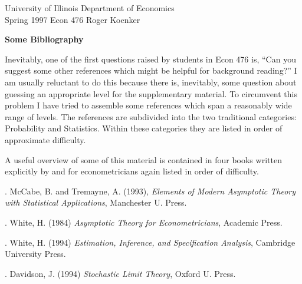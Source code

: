 \setlength{\textwidth}{170mm}
\setlength{\textheight}{220mm}
\setlength{\oddsidemargin}{0mm}
\setlength{\evensidemargin}{10mm}
\setlength{\topmargin}{-10mm}
\def\RR{\hbox{\raise.4ex\hbox{$\scriptstyle{|}$}\hskip-1.85pt R}}
\newcommand{\REF}{\nopagebreak\noindent{\large{\bf
      References}}\vspace{.2in}}

\newcommand{\Ref}[1]{\medskip\noindent\hangafter=1
      \hangindent=20pt\ignorespaces #1}
\pagestyle{empty}



\noindent
University of Illinois \hfill Department of Economics \\
Spring 1997 \hfill Econ 476 \hfill Roger Koenker

\vspace{4mm}
\begin{center}

\large{
{\bf Some Bibliography }}
\end{center}

\vspace{10mm}
Inevitably, one of the first questions raised by students in Econ 476 is, ``Can you suggest some other references which might be helpful for 
background reading?''  I am usually reluctant to do this because there is, 
inevitably, some question about guessing an appropriate level for the 
supplementary material.  To circumvent this problem I have tried to 
assemble some references which span a reasonably wide range of levels.  The
references are subdivided into the two traditional categories:  Probability 
and Statistics.  Within these categories they are listed in order of 
approximate difficulty.

A useful overview of some of this material is contained in four books
written explicitly by and for econometricians again listed in order of
difficulty.

\vspace{2mm}
\Ref 1.   McCabe, B. and Tremayne, A. (1993), {\it Elements of Modern
Asymptotic Theory with Statistical Applications}, Manchester U. Press.

\Ref 2.  White, H. (1984) {\it Asymptotic Theory for Econometricians},
Academic Press.

\Ref 3. White, H. (1994) 
{\it Estimation, Inference, and Specification Analysis}, 
Cambridge University Press.

\Ref 4.  Davidson, J. (1994) {\it Stochastic Limit Theory}, Oxford U. Press.

